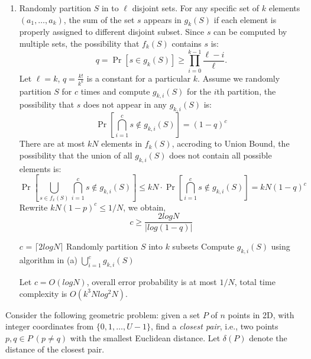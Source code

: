 \documentclass[11pt]{article}
\begin{document}
\begin{description}
\begin{enumerate}
  \item[(b)]
  Randomly partition $S$ in to $\ell$ disjoint sets.
  For any specific set of $k$ elements $(a_1, \ldots, a_k)$, the sum of the set $s$ appears
  in $g_k(S)$ if each element is properly assigned to different disjoint subset.
  Since $s$ can be computed by multiple sets, the possibility that $f_k(S)$ contains
  $s$ is:
  \begin{equation}
    q = \Pr[s\in g_k(S)] \ge \prod_{i=0}^{k-1} \frac{\ell-i}{\ell}.
  \end{equation}
  Let $\ell = k$, $q = \frac{k!}{k^k}$ is a constant for a particular $k$.
  Assume we randomly partition $S$ for $c$ times and compute $g_{k,i}(S)$ for the $i$th partition, 
  the possibility that $s$ does not appear in any $g_{k,i}(S)$ is:
  \begin{equation}
    \Pr\left[\bigcap_{i=1}^{c}s\notin g_{k,i}(S)\right] = (1-q)^c
  \end{equation}
  There are at most $kN$ elements in $f_k(S)$, accroding to Union Bound, 
  the possibility that the union of all $g_{k,i}(S)$
  does not contain all possible elements is:
  \begin{equation}
    \Pr\left[\bigcup_{s\in f_x(S)}\bigcap_{i=1}^{c}s\notin g_{k,i}(S)\right] 
    \le kN\cdot\Pr\left[\bigcap_{i=1}^{c}s\notin g_{k,i}(S)\right]
    = kN(1-q)^c
  \end{equation}
  Rewrite $kN(1-p)^c \le 1/N$, we obtain,
  \begin{equation}
    c \ge \frac{2logN}{|log(1-q)|}
  \end{equation}

  \begin{algorithm}
  \caption{}
  \begin{algorithmic}[1]
    \State $c$ = $\lceil2logN\rceil$
      \State Randomly partition $S$ into $k$ subsets
      \State Compute $g_{k,i}(S)$ using algorithm in (a)
    \EndFor
    \State \Return $\bigcup_{i=1}^{c}g_{k,i}(S)$
  \end{algorithmic}
  \end{algorithm}

  Let $c = O(logN)$, overall error probability is at most $1/N$, 
  total time complexity is $O(k^3Nlog^2N)$.



\end{enumerate}


\newpage
\item[Problem 5.3:]
Consider the following geometric problem: given a set $P$ of 
$n$ points in 2D, with integer coordinates from $\{0,1,\ldots,U-1\}$, 
find a {\em closest pair\/}, i.e., two points
$p,q\in P\ (p\neq q)$  with the smallest Euclidean distance.
Let $\delta(P)$ denote the distance of the closest pair.


\end{description}
\end{document}
